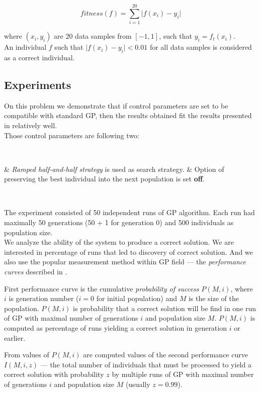 \documentclass[12pt,a4paper]{report}
\newenvironment{enum}
{\begin{easylist}[itemize]}
{\end{easylist}}
\begin{document}
$$ fitness(f) =  \sum\limits_{i=1}^{20}{ \vert f(x_i)-y_i }\vert   $$

where $(x_i,y_i)$ are 20 data samples from $[-1,1]$, such that $y_i = f_t(x_i)$.\\

An individual $f$ such that $\vert f(x_i)-y_i \vert < 0.01 $ for all data samples is 
considered as a correct individual.\\

\newpage
\subsection{Experiments}

On this problem we demonstrate that if control parameters are set to be
compatible with standard GP, then the results obtained fit the results
presented in \cite{koza92} relatively well. \\

Those control parameters are following two:

~\begin{enum}
 & \textit{Ramped half-and-half strategy} is used as search strategy.
 & Option of preserving the best individual into the next population is set \textbf{off}.
\end{enum}~

The experiment consisted of 50 independent runs of GP algorithm.
Each run had maximally 50 generations (50 + 1 for generation 0)
and 500 individuals as population size.\\

We analyze the ability of the system to produce a correct solution.
We are interested in percentage of runs that led to discovery of
correct solution. And we also use the popular measurement  
method within GP field --- the \textit{performance curves}
described in \cite{koza92}.

First performance curve is the cumulative \textit{probability of success}
$P(M,i)$, where $i$ is generation number ($i = 0$ for initial population) 
and $M$ is the size of the population. 
$P(M,i)$ is probability that a correct solution will
be find in one run of GP with maximal number of generations $i$ and 
population size $M$. $P(M,i)$ is computed as percentage of 
runs yielding a correct solution in generation $i$ or earlier.

From values of $P(M,i)$ are computed values of the second performance curve
$I(M,i,z)$
--- the total number of individuals that must be processed to yield a correct
solution with probability $z$ by multiple runs of GP with maximal 
number of generations $i$ and population size $M$ (usually $z = 0.99$).
\end{document}
